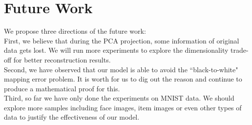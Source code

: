 \documentclass[12pt]{report} %
\begin{document}
\section{Future Work}
We propose three directions of the future work:\\
First, we believe that during the PCA projection, some information of original data gets lost. We will run more experiments to explore the dimensionality trade-off for better reconstruction results.\\
Second, we have observed that our model is able to avoid the ``black-to-white" mapping error problem. It is worth for us to dig out the reason and continue to produce a mathematical proof for this.\\
Third, so far we have only done the experiments on MNIST data. We should explore more samples including face images, item images or even other types of data to justify the effectiveness of our model.
\end{document}
